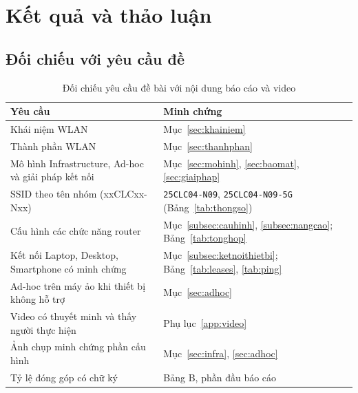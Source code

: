 \documentclass[12pt,a4paper]{article}
\numberwithin{figure}{section}
\numberwithin{table}{section}
\newcommand{\mono}[1]{\texttt{#1}}
\begin{document}
\section{Kết quả và thảo luận}
\label{sec:ketqua}

\subsection{Đối chiếu với yêu cầu đề}
\begin{table}[H]
  \centering\small
  \caption{Đối chiếu yêu cầu đề bài với nội dung báo cáo và video}
  \label{tab:doichieu}
  \begin{tabularx}{\linewidth}{@{}L P{6.2cm}@{}}
    \toprule
    \textbf{Yêu cầu} & \textbf{Minh chứng}\\
    \midrule
    Khái niệm WLAN & Mục~\ref{sec:khainiem}\\
    Thành phần WLAN & Mục~\ref{sec:thanhphan}\\
    Mô hình Infrastructure, Ad-hoc và giải pháp kết nối & Mục~\ref{sec:mohinh},
    \ref{sec:baomat}, \ref{sec:giaiphap}\\
    SSID theo tên nhóm (xxCLCxx-Nxx) & \mono{25CLC04-N09},
    \mono{25CLC04-N09-5G} (Bảng~\ref{tab:thongso})\\
    Cấu hình các chức năng router & Mục~\ref{subsec:cauhinh}, \ref{subsec:nangcao};
    Bảng~\ref{tab:tonghop}\\
    Kết nối Laptop, Desktop, Smartphone có minh chứng & Mục~\ref{subsec:ketnoithietbi};
    Bảng~\ref{tab:leases}, \ref{tab:ping}\\
    Ad-hoc trên máy ảo khi thiết bị không hỗ trợ & Mục~\ref{sec:adhoc}\\
    Video có thuyết minh và thấy người thực hiện & Phụ lục~\ref{app:video}\\
    Ảnh chụp minh chứng phần cấu hình & Mục~\ref{sec:infra}, \ref{sec:adhoc}\\
    Tỷ lệ đóng góp có chữ ký & Bảng B, phần đầu báo cáo\\
    \bottomrule
  \end{tabularx}
\end{table}
\end{document}

